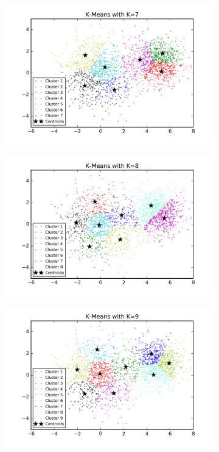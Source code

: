 \begin{description}
\begin{description}
\begin{figure}[!h]
\begin{subfigure}[b]{0.475\textwidth}
            \includegraphics[width=\textwidth]{./figures/clustering_kMeans_7.png}
        \end{subfigure}
        \hfill
        \begin{subfigure}[b]{0.475\textwidth}  
            \centering 
            \includegraphics[width=\textwidth]{./figures/clustering_kMeans_8.png}
        \end{subfigure}
        \begin{subfigure}[b]{0.475\textwidth}   
            \centering 
            \includegraphics[width=\textwidth]{./figures/clustering_kMeans_9.png}

\end{subfigure}
\end{figure}
\end{description}
\end{description}
